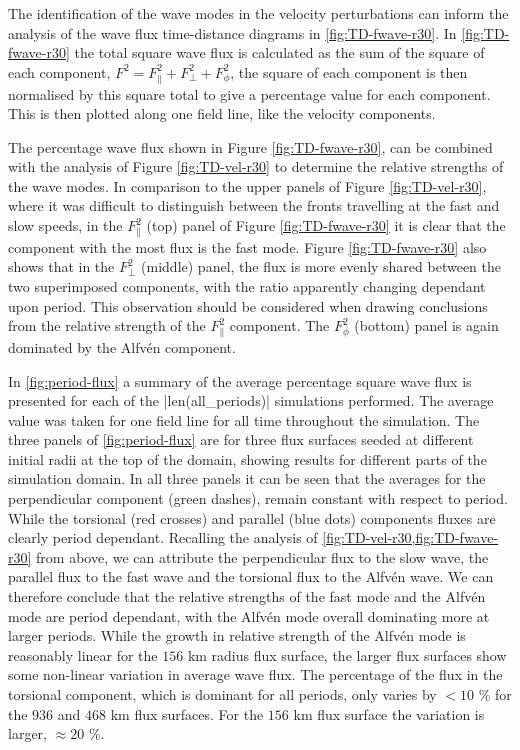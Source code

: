 The identification of the wave modes in the velocity perturbations can inform the analysis of the wave flux time-distance diagrams in \cref{fig:TD-fwave-r30}.
In \cref{fig:TD-fwave-r30} the total square wave flux is calculated as the sum of the square of each component, $ F^2 = F_\parallel^2 + F_\perp ^2  + F_\phi^2$, the square of each component is then normalised by this square total to give a percentage value for each component.
This is then plotted along one field line, like the velocity components.


The percentage wave flux shown in Figure \ref{fig:TD-fwave-r30}, can be combined with the analysis of Figure \ref{fig:TD-vel-r30} to determine the relative strengths of the wave modes.
In comparison to the upper panels of Figure \ref{fig:TD-vel-r30}, where it was difficult to distinguish between the fronts travelling at the fast and slow speeds, in the $F^2_\parallel$ (top) panel of Figure \ref{fig:TD-fwave-r30} it is clear that the component with the most flux is the fast mode.
Figure \ref{fig:TD-fwave-r30} also shows that in the $F^2_\perp$ (middle) panel, the flux is more evenly shared between the two superimposed components, with the ratio apparently changing dependant upon period.
This observation should be considered when drawing conclusions from the relative strength of the $F^2_\parallel$ component.
The $F^2_\phi$ (bottom) panel is again dominated by the Alfv\'en component.

In \cref{fig:period-flux} a summary of the average percentage square wave flux is presented for each of the \py[chapter6]|len(all_periods)| simulations performed.
The average value was taken for one field line for all time throughout the simulation.
The three panels of \cref{fig:period-flux} are for three flux surfaces seeded at different initial radii at the top of the domain, showing results for different parts of the simulation domain.
In all three panels it can be seen that the averages for the perpendicular component (green dashes), remain constant with respect to period.
While the torsional (red crosses) and parallel (blue dots) components fluxes are clearly period dependant.
Recalling the analysis of \cref{fig:TD-vel-r30,fig:TD-fwave-r30} from above, we can attribute the perpendicular flux to the slow wave, the parallel flux to the fast wave and the torsional flux to the Alfv\'en wave.
We can therefore conclude that the relative strengths of the fast mode and the Alfv\'en mode are period dependant, with the Alfv\'en mode overall dominating more at larger periods.
While the growth in relative strength of the Alfv\'en mode is reasonably linear for the $156$ km radius flux surface, the larger flux surfaces show some non-linear variation in average wave flux. 
The percentage of the flux in the torsional component, which is dominant for all periods, only varies by $<10$ \% for the $936$ and $468$ km flux surfaces.
For the $156$ km flux surface the variation is larger, $\approx 20$ \%.

